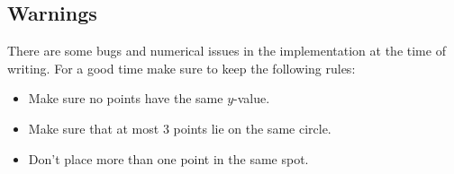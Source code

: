 \subsection*{Warnings}
There are some bugs and numerical issues in the implementation at the time of writing. For a good time make sure to keep the following rules:
\begin{itemize}
    \item Make sure no points have the same $y$-value.
    \item Make sure that at most 3 points lie on the same circle.
    \item Don't place more than one point in the same spot.
\end{itemize}